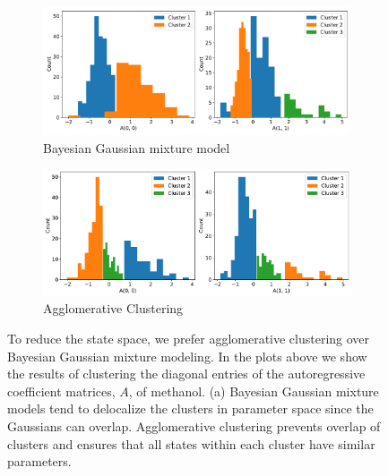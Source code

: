 \documentclass{article}
\begin{document}
  \begin{figure}[h]
  \centering
  \begin{subfigure}{0.95\textwidth}
  \includegraphics[width=\textwidth]{bayesian_A.pdf}
  \caption{Bayesian Gaussian mixture model}\label{fig:bayesian_A}
  \end{subfigure}
  \begin{subfigure}{0.95\textwidth}
  \includegraphics[width=\textwidth]{agglomerative_A.pdf}
  \caption{Agglomerative Clustering}\label{fig:agglomerative_A}
  \end{subfigure}
  \caption{To reduce the state space, we prefer agglomerative clustering over Bayesian
  Gaussian mixture modeling. In the plots above we show the results of clustering the
  diagonal entries of the autoregressive coefficient matrices, $A$, of methanol. (a) 
  Bayesian Gaussian mixture models tend to delocalize the clusters in parameter space
  since the Gaussians can overlap. Agglomerative clustering prevents overlap of 
  clusters and ensures that all states within each cluster have similar parameters.
  }\label{fig:clustering_choice}
  \end{figure}
  
  \newpage
  
%  
  
\end{document}

